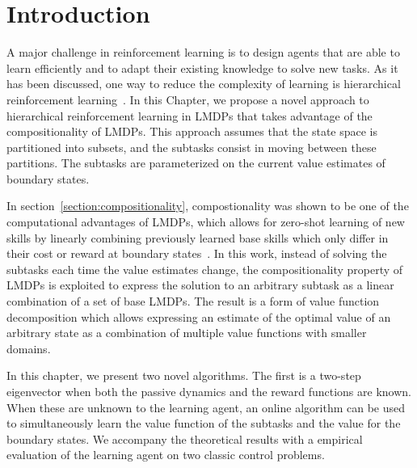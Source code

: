 \section{Introduction}
A major challenge in reinforcement learning is to design agents that are able to learn efficiently and to adapt their existing knowledge to solve new tasks. As it has been discussed, one way to reduce the complexity of learning is hierarchical reinforcement learning~\citep{Sutton1999, Dietterich2000, Barto2003}. In this Chapter, we propose a novel approach to hierarchical reinforcement learning in LMDPs that takes advantage of the compositionality of LMDPs. This approach assumes that the state space is partitioned into subsets, and the subtasks consist in moving between these partitions. The subtasks are parameterized on the current value estimates of boundary states. 

In section~\ref{section:compositionality}, compostionality was shown to be one of the computational advantages of LMDPs, which allows for zero-shot learning of new skills by linearly combining previously learned base skills which only differ in their cost or reward at boundary states~\citep{Todorov2009,Silva2009}.  In this work, instead of solving the subtasks each time the value estimates change, the compositionality property of LMDPs is exploited to express the solution to an arbitrary subtask as a linear combination of a set of base LMDPs. The result is a form of value function decomposition which allows expressing an estimate of the optimal value of an arbitrary state as a combination of multiple value functions with smaller domains.

In this chapter, we present two novel algorithms. The first is a two-step eigenvector when both the passive dynamics and the reward functions are known. When these are unknown to the learning agent, an online algorithm can be used to simultaneously learn the value function of the subtasks and the value for the boundary states. 
We accompany the theoretical results with a empirical evaluation of the learning agent on two classic control problems.

